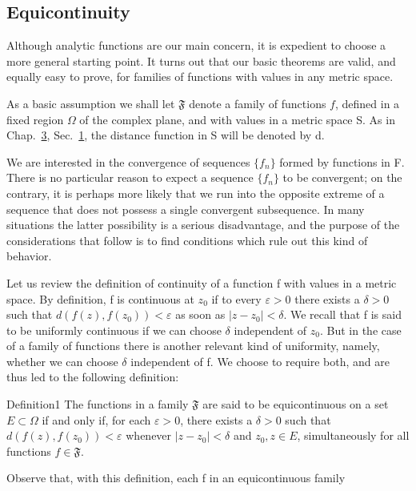 \setcounter{section}{5}\setcounter{subsection}{0}\subsection{Equicontinuity}\label{sec:5.5.1}
Although analytic functions are our main concern, it is expedient to choose a more general starting point. It turns out that our basic theorems are valid, and equally easy to prove, for families of functions with values in any metric space.

As a basic assumption we shall let $\mathfrak{F}$ denote a family of functions $f$, defined in a fixed region $\Omega$ of the complex plane, and with values in a metric space S. As in Chap.~\hyperref[chap:3]{3}, Sec.~\hyperref[sec:3.1]{1}, the distance function in S will be denoted by d.

We are interested in the convergence of sequences $\{f_{n}\}$ formed by functions in F. There is no particular reason to expect a sequence $\{f_{n}\}$ to be convergent; on the contrary, it is perhaps more likely that we run into the opposite extreme of a sequence that does not possess a single convergent subsequence. In many situations the latter possibility is a serious disadvantage, and the purpose of the considerations that follow is to find conditions which rule out this kind of behavior.

Let us review the definition of continuity of a function f with values in a metric space. By definition, f is continuous at $z_{0}$ if to every $\varepsilon > 0$ there exists a $\delta > 0$ such that $d(f(z), f(z_{0})) < \varepsilon$ as soon as $|z - z_{0}| < \delta$. We recall that f is said to be uniformly continuous if we can choose $\delta$ independent of $z_{0}$. But in the case of a family of functions there is another relevant kind of uniformity, namely, whether we can choose $\delta$ independent of f. We choose to require both, and are thus led to the following definition:

\begin{originalstatement}{Definition}{1}\label{def:5.1}
The functions in a family $\mathfrak{F}$ are said to be equicontinuous on a set $E \subset \Omega$ if and only if, for each $\varepsilon > 0$, there exists a $\delta > 0$ such that $d(f(z), f(z_0)) < \varepsilon$ whenever $|z - z_0| < \delta$ and $z_0, z \in E$, simultaneously for all functions $f \in \mathfrak{F}$.
\end{originalstatement}
Observe that, with this definition, each f in an equicontinuous family



